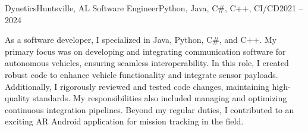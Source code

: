 \Experience
{Dynetics}{Huntsville, AL}
{Software Engineer}{Python, Java, C\#, C++, CI/CD}{2021 – 2024}

 As a software developer, I specialized in Java, Python, C\#, and C++. My primary focus was on developing and integrating communication software for autonomous vehicles, ensuring seamless interoperability. In this role, I created robust code to enhance vehicle functionality and integrate sensor payloads. Additionally, I rigorously reviewed and tested code changes, maintaining high-quality standards. My responsibilities also included managing and optimizing continuous integration pipelines. Beyond my regular duties, I contributed to an exciting AR Android application for mission tracking in the field.

